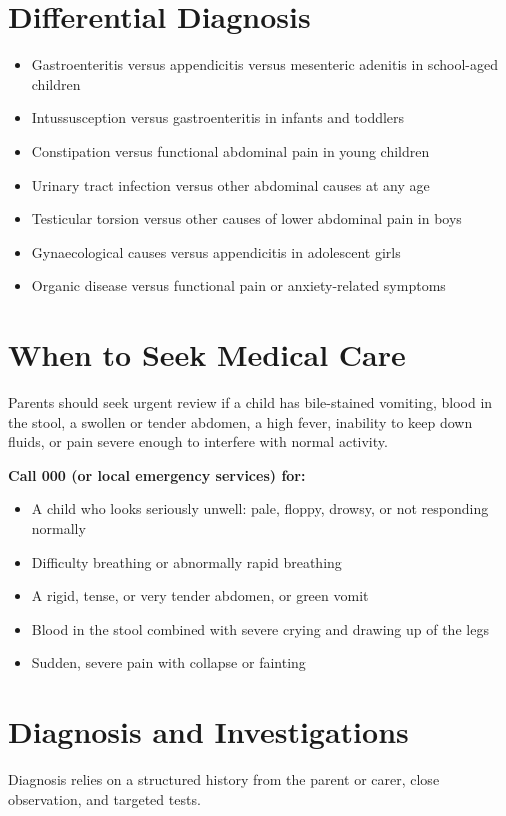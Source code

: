 \section*{Differential Diagnosis}
\begin{itemize}
    \item Gastroenteritis versus appendicitis versus mesenteric adenitis in school-aged children
    \item Intussusception versus gastroenteritis in infants and toddlers
    \item Constipation versus functional abdominal pain in young children
    \item Urinary tract infection versus other abdominal causes at any age
    \item Testicular torsion versus other causes of lower abdominal pain in boys
    \item Gynaecological causes versus appendicitis in adolescent girls
    \item Organic disease versus functional pain or anxiety-related symptoms
\end{itemize}

\section*{When to Seek Medical Care}
Parents should seek urgent review if a child has bile-stained vomiting, blood in the stool, a swollen or tender abdomen, a high fever, inability to keep down fluids, or pain severe enough to interfere with normal activity.

\textbf{Call 000 (or local emergency services) for:}
\begin{itemize}
    \item A child who looks seriously unwell: pale, floppy, drowsy, or not responding normally
    \item Difficulty breathing or abnormally rapid breathing
    \item A rigid, tense, or very tender abdomen, or green vomit
    \item Blood in the stool combined with severe crying and drawing up of the legs
    \item Sudden, severe pain with collapse or fainting
\end{itemize}

\section*{Diagnosis and Investigations}
Diagnosis relies on a structured history from the parent or carer, close observation, and targeted tests.

